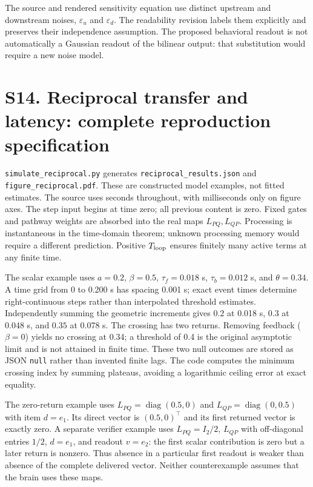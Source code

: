 \documentclass[11pt,a4paper]{article}
\begin{document}
The source and rendered sensitivity equation use distinct upstream and downstream noises, $\varepsilon_u$ and $\varepsilon_d$. The readability revision labels them explicitly and preserves their independence assumption. The proposed behavioral readout is not automatically a Gaussian readout of the bilinear output: that substitution would require a new noise model.
\section*{S14. Reciprocal transfer and latency: complete reproduction specification}
\texttt{simulate\_reciprocal.py} generates \texttt{reciprocal\_results.json} and \texttt{figure\_reciprocal.pdf}. These are constructed model examples, not fitted estimates. The source uses seconds throughout, with milliseconds only on figure axes. The step input begins at time zero; all previous content is zero. Fixed gates and pathway weights are absorbed into the real maps $L_{PQ},L_{QP}$. Processing is instantaneous in the time-domain theorem; unknown processing memory would require a different prediction. Positive $T_{\rm loop}$ ensures finitely many active terms at any finite time.

The scalar example uses $a=0.2$, $\beta=0.5$, $\tau_f=0.018$ s, $\tau_b=0.012$ s, and $\theta=0.34$. A time grid from 0 to 0.200 s has spacing 0.001 s; exact event times determine right-continuous steps rather than interpolated threshold estimates. Independently summing the geometric increments gives $0.2$ at 0.018 s, $0.3$ at 0.048 s, and $0.35$ at 0.078 s. The crossing has two returns. Removing feedback ($\beta=0$) yields no crossing at 0.34; a threshold of 0.4 is the original asymptotic limit and is not attained in finite time. These two null outcomes are stored as JSON \texttt{null} rather than invented finite lags. The code computes the minimum crossing index by summing plateaus, avoiding a logarithmic ceiling error at exact equality.

The zero-return example uses $L_{PQ}=\operatorname{diag}(0.5,0)$ and $L_{QP}=\operatorname{diag}(0,0.5)$ with item $d=e_1$. Its direct vector is $(0.5,0)^\top$ and its first returned vector is exactly zero. A separate verifier example uses $L_{PQ}=I_2/2$, $L_{QP}$ with off-diagonal entries $1/2$, $d=e_1$, and readout $v=e_2$: the first scalar contribution is zero but a later return is nonzero. Thus absence in a particular first readout is weaker than absence of the complete delivered vector. Neither counterexample assumes that the brain uses these maps.
\end{document}
